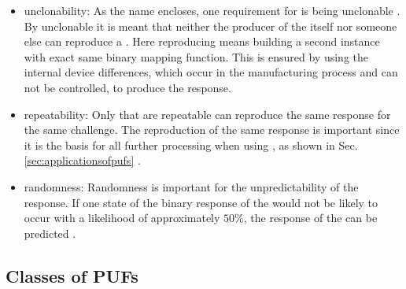 \begin{itemize}
\item unclonability: As the name \puf encloses, one requirement for \pufs is being unclonable \cite{Tajik2014PhysicalPUFs}.
By unclonable it is meant that neither the producer of the \puf itself nor someone else can reproduce a \puf.
Here reproducing means building a second instance with exact same binary mapping function.
This is ensured by using the internal device differences, which occur in the manufacturing process and can not be controlled, to produce the \puf response.
\item repeatability: Only \pufs that are repeatable can reproduce the same response for the same challenge.
The reproduction of the same response is important since it is the basis for all further processing when using \pufs, as shown in Sec. \ref{sec:applicationsofpufs} \cite{Armknecht2011AFunctions}.
\item randomness: Randomness is important for the unpredictability of the \puf response.
If one state of the binary response of the \puf would not be likely to occur with a likelihood of approximately $50 \%$, the response of the \puf can be predicted \cite{CherifJouini2011PerformanceStatistics}.
\end{itemize}



\subsection{Classes of PUFs}
\label{sec:classesofpufs}

